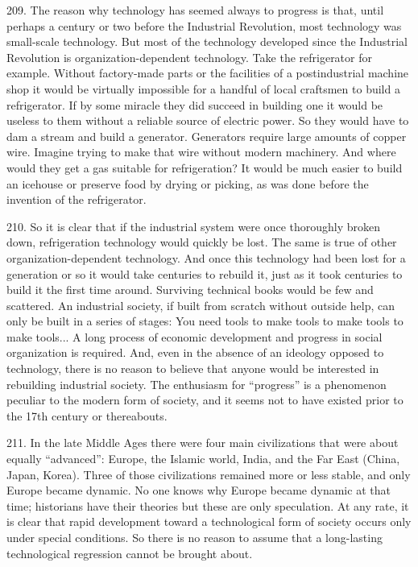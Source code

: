 \documentclass{article}
\begin{document}
209. The reason why technology has seemed always to progress is that, until perhaps a century or 
two before the Industrial Revolution, most technology was small-scale technology. But most of 
the technology developed since the Industrial Revolution is organization-dependent 
technology. Take the refrigerator for example. Without factory-made parts or the facilities of a 
postindustrial machine shop it would be virtually impossible for a handful of local craftsmen to 
build a refrigerator. If by some miracle they did succeed in building one it would be useless to 
them without a reliable source of electric power. So they would have to dam a stream and build a 
generator. Generators require large amounts of copper wire. Imagine trying to make that wire 
without modern machinery. And where would they get a gas suitable for refrigeration? It would 
be much easier to build an icehouse or preserve food by drying or picking, as was done before the 
invention of the refrigerator. \vspace{\baselineskip}

210. So it is clear that if the industrial system were once thoroughly broken down, refrigeration 
technology would quickly be lost. The same is true of other organization-dependent 
technology. And once this technology had been lost for a generation or so it would take centuries 
to rebuild it, just as it took centuries to build it the first time around. Surviving technical books 
would be few and scattered. An industrial society, if built from scratch without outside help, can 
only be built in a series of stages: You need tools to make tools to make tools to make tools... A 
long process of economic development and progress in social organization is required. And, even 
in the absence of an ideology opposed to technology, there is no reason to believe that anyone 
would be interested in rebuilding industrial society. The enthusiasm for “progress” is a 
phenomenon peculiar to the modern form of society, and it seems not to have existed prior to the 
17th century or thereabouts. \vspace{\baselineskip}

211. In the late Middle Ages there were four main civilizations that were about equally 
“advanced”: Europe, the Islamic world, India, and the Far East (China, Japan, Korea). Three of 
those civilizations remained more or less stable, and only Europe became dynamic. No one knows 
why Europe became dynamic at that time; historians have their theories but these are only 
speculation. At any rate, it is clear that rapid development toward a technological form of society 
occurs only under special conditions. So there is no reason to assume that a long-lasting 
technological regression cannot be brought about. \vspace{\baselineskip}
\end{document}
